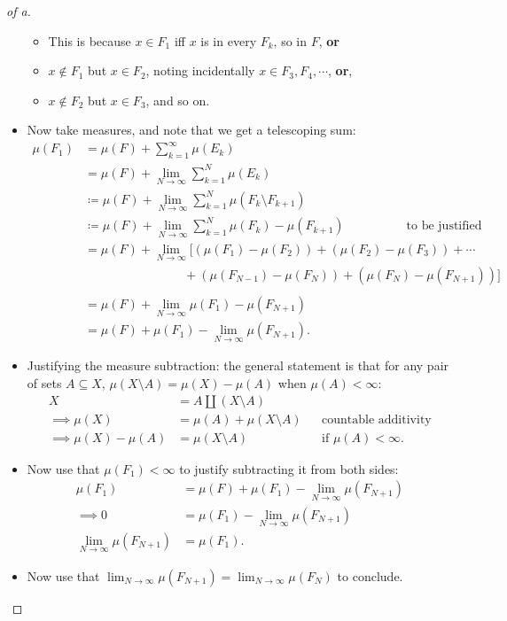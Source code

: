\begin{solution}
\begin{proof}[of a]
\begin{itemize}
  \begin{itemize}
  \tightlist
  \item
    This is because \(x\in F_1\) iff \(x\) is in every \(F_k\), so in
    \(F\), \textbf{or}
  \item
    \(x\not \in F_1\) but \(x\in F_2\), noting incidentally
    \(x\in F_3, F_4,\cdots\), \textbf{or},
  \item
    \(x\not\in F_2\) but \(x\in F_3\), and so on.
  \end{itemize}
\item
  Now take measures, and note that we get a telescoping sum:
  \begin{align*}
  \mu(F_1) 
  &= \mu(F) + \sum_{k=1}^\infty \mu(E_k) \\
  &= \mu(F) + \lim_{N\to\infty} \sum_{k=1}^N \mu(E_k) \\
  &\coloneqq\mu(F) + \lim_{N\to\infty} \sum_{k=1}^N \mu(F_k \setminus F_{k+1} ) \\
  &\coloneqq\mu(F) + \lim_{N\to\infty} \sum_{k=1}^N \mu(F_k) - \mu(F_{k+1} ) \hspace{5em}\text{to be justified}\\
  &= \mu(F) + \lim_{N\to\infty} 
  [
  (\mu(F_1) - \mu(F_2)) +  
  (\mu(F_2) - \mu(F_3)) +  
  \cdots \\ 
  & \hspace{8em} + (\mu(F_{N-1}) - \mu(F_N)) +  
  (\mu(F_N) - \mu(F_{N+1})) 
  ] \\ \\
  &= \mu(F) + \lim_{N\to\infty} \mu(F_1) - \mu(F_{N+1}) \\
  &= \mu(F) + \mu(F_1) - \lim_{N\to\infty} \mu(F_{N+1})
  .\end{align*}
\item
  Justifying the measure subtraction: the general statement is that for
  any pair of sets \(A\subseteq X\),
  \(\mu(X\setminus A) = \mu(X) - \mu(A)\) when \(\mu(A) < \infty\):
  \begin{align*}
  X &= A {\textstyle\coprod}(X\setminus A) \\
  \implies \mu(X) &= \mu(A) + \mu(X\setminus A) && \text{countable additivity} \\
  \implies \mu(X) -\mu(A) &= \mu(X\setminus A) && \text{if } \mu(A) < \infty 
  .\end{align*}
\item
  Now use that \(\mu(F_1)<\infty\) to justify subtracting it from both
  sides:
  \begin{align*}
  \mu(F_1)
  &= \mu(F) + \mu(F_1) - \lim_{N\to\infty} \mu(F_{N+1}) \\
  \implies
  0
  &= \mu(F_1) - \lim_{N\to\infty} \mu(F_{N+1}) \\
  \lim_{N\to\infty} \mu(F_{N+1})
  &= \mu(F_1) 
  .\end{align*}
\item
  Now use that
  \(\lim_{N\to\infty}\mu(F_{N+1}) = \lim_{N\to\infty} \mu(F_N)\) to
  conclude.
\end{itemize}


\end{proof}
\end{solution}
